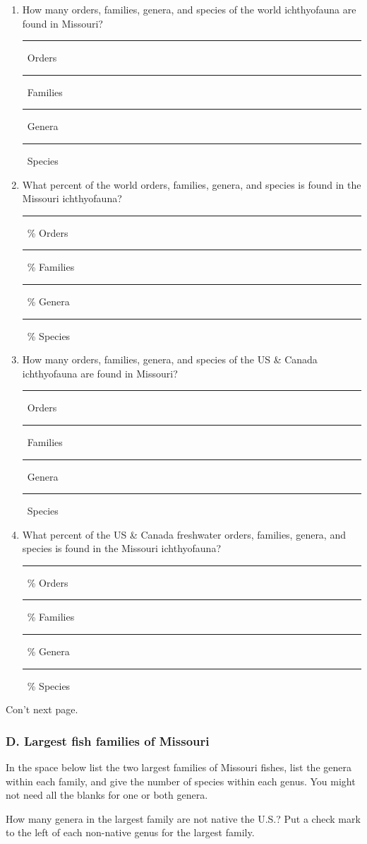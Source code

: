 \documentclass[12pt]{exam}
\newcommand{\shortblank}{\quad\rule{0.5in}{0.4pt}}
\begin{document}
\begin{enumerate}[resume]

\item How many orders, families, genera, and species of the world
ichthyofauna are found in Missouri?

\shortblank~Orders \shortblank~Families \shortblank~Genera \shortblank~Species

\item What percent of the world orders, families, genera, and species is
found in the Missouri ichthyofauna?

\shortblank~\% Orders \shortblank~\% Families \shortblank~\% Genera \shortblank~\% Species

\item How many orders, families, genera, and species of the US \& Canada
ichthyofauna are found in Missouri?

\shortblank~Orders \shortblank~Families \shortblank~Genera \shortblank~Species

\item What percent of the US \& Canada freshwater orders, families, genera,
and species is found in the Missouri ichthyofauna?

\shortblank~\% Orders \shortblank~\% Families \shortblank~\% Genera \shortblank~\% Species
\end{enumerate}

\vfill

Con't next page.

\subsubsection*{D. Largest fish families of Missouri}

In the space below list the two largest families of Missouri fishes, list the genera within each family, and give the
number of species within each genus. You might not need all the blanks for one or both genera.

How many genera in the largest family are not native the U.S.? Put a check mark to the left of each non-native genus for the largest family.
\end{document}
